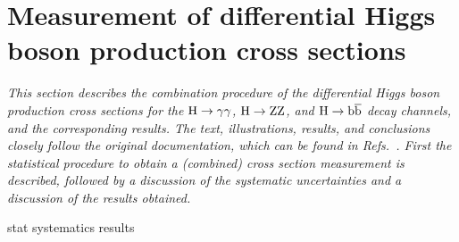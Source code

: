 \section{Measurement of differential Higgs boson production cross sections}
\label{sec:diffxs}

\emph{%
This section describes the combination procedure of the differential Higgs boson production cross sections for the $\mathrm{H}\to\mathrm{\gamma}\mathrm{\gamma}$, $\mathrm{H}\to\mathrm{Z}\mathrm{Z}$, and $\mathrm{H}\to\mathrm{b}\overline{\mathrm{b}}$ decay channels, and the corresponding results. The text, illustrations, results, and conclusions closely follow the original documentation, which can be found in Refs.~\cite{AN-17-244,HIG-17-028}. First the statistical procedure to obtain a (combined) cross section measurement is described, followed by a discussion of the systematic uncertainties and a discussion of the results obtained.
}

{stat}
{systematics}
{results}
